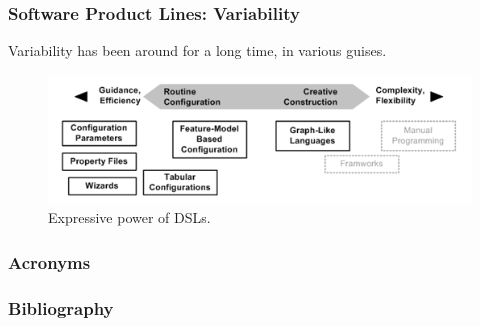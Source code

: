 \documentclass{beamer}
\begin{document}
\begin{frame}
\frametitle{Software Product Lines: Variability}

Variability has been around for a long time, in various guises.

\begin{figure}
  \centering
  \includegraphics[scale=0.6]{images/variability_spectrum_voelter.png}
  \caption{Expressive power of \ac{DSL}s.\cite{groher2007expressing}}
\end{figure}

\end{frame}

\begin{frame}
\frametitle{Acronyms}

\begin{acronym}
\end{acronym}

\end{frame}

\begin{frame}
\frametitle{Bibliography}

\printbibliography

\end{frame}
\end{document}
